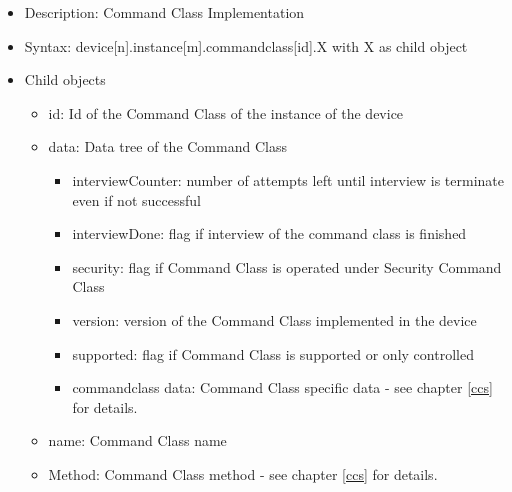 \begin {itemize}
\item Description: Command Class Implementation
\item Syntax:  device[n].instance[m].commandclass[id].X with X as child object
\item Child objects
\begin {itemize}
\item id: Id of the Command Class of the instance of the device
\item data: Data tree of the Command Class
\begin {itemize}
\item interviewCounter: number of attempts left until interview is terminate even if not successful
\item interviewDone: flag if interview of the command class is finished
\item security: flag if Command Class is operated under Security Command Class
\item version: version of the Command Class implemented in the device
\item supported: flag if Command Class is supported or only controlled
\item {commandclass data}: Command Class specific data - see chapter \ref{ccs} for details.
\end {itemize}
\item name: Command Class name
\item {Method}: Command Class method - see chapter \ref{ccs} for details.
\end {itemize}
\end {itemize}


 
